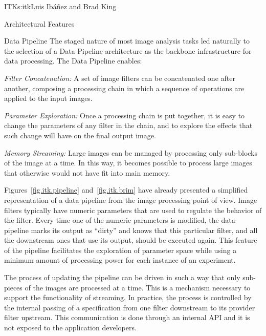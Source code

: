 \begin{aosachapter}{ITK}{s:itk}{Luis Ib\'{a}\~{n}ez and Brad King}
\begin{aosasect1}{Architectural Features}
\begin{aosasect2}{Data Pipeline}\label{sec.itk.datapipeline}
The staged nature of most image analysis tasks led naturally to the selection
of a Data Pipeline architecture as the backbone infrastructure for data
processing. The Data Pipeline enables:

\begin{aosaitemize}

\item \emph{Filter Concatenation:} A set of image filters can be concatenated
one after another, composing a processing chain in which a sequence of
operations are applied to the input images.

\item \emph{Parameter Exploration:} Once a processing chain is put together,
it is easy to change the parameters of any filter in the chain, and to explore
the effects that such change will have on the final output image.

\item \emph{Memory Streaming:} Large images can be managed by processing only
sub-blocks of the image at a time. In this way, it becomes possible to
process large images that otherwise would not have fit into main memory.

\end{aosaitemize}

Figures~\ref{fig.itk.pipeline} and~\ref{fig.itk.brim} have already presented a
simplified representation of a data pipeline from the image processing point of
view. Image filters typically have numeric parameters that are used to
regulate the behavior of the filter. Every time one of the numeric
parameters is modified, the data pipeline marks its output as ``dirty'' and
knows that this particular filter, and all the downstream ones that use its
output, should be executed again. This feature of the pipeline facilitates the
exploration of  parameter space while using a minimum amount of
processing power for each instance of an experiment.

The process of updating the pipeline can be driven in such a way that only
sub-pieces of the images are processed at a time. This is a mechanism necessary
to support the functionality of streaming. In practice, the process is
controlled by the internal passing of a  specification
from one filter downstream to its provider filter upstream. This communication
is done through an internal API and it is not exposed to the application
developers. 


\end{aosasect2}
\end{aosasect1}
\end{aosachapter}
